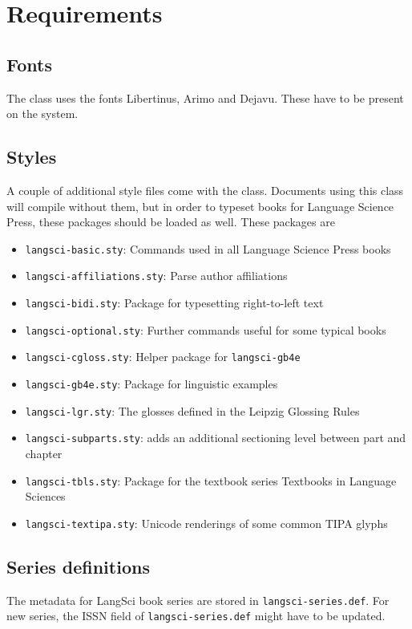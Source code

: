\documentclass[%
output=guidelines,guidelines]{langscibook}
\begin{document}
\chapter{Requirements}
\section{Fonts}
The class uses the fonts Libertinus, Arimo and Dejavu. These have to be present on the system.

\section{Styles}
A couple of additional style files come with the class. Documents using this class will compile without them, but in order to typeset books for Language Science Press, these packages should be loaded as well. These packages are

\begin{itemize}
 \item \texttt{langsci-basic.sty}: Commands used in all Language Science Press books
 \item \texttt{langsci-affiliations.sty}: Parse author affiliations
 \item \texttt{langsci-bidi.sty}: Package for typesetting right-to-left text
 \item \texttt{langsci-optional.sty}: Further commands useful for some typical books
 \item \texttt{langsci-cgloss.sty}: Helper package for \texttt{langsci-gb4e}
 \item \texttt{langsci-gb4e.sty}: Package for linguistic examples
 \item \texttt{langsci-lgr.sty}: The glosses defined in the Leipzig Glossing Rules
 \item \texttt{langsci-subparts.sty}: adds an additional sectioning level between part and chapter
 \item \texttt{langsci-tbls.sty}: Package for the textbook series Textbooks in Language Sciences
 \item \texttt{langsci-textipa.sty}: Unicode renderings of some common TIPA glyphs

\end{itemize}

\section{Series definitions}
The metadata for LangSci book series are stored in   \texttt{langsci-series.def}.  For new series, the ISSN field of \texttt{langsci-series.def} might have to be updated.
\end{document}

